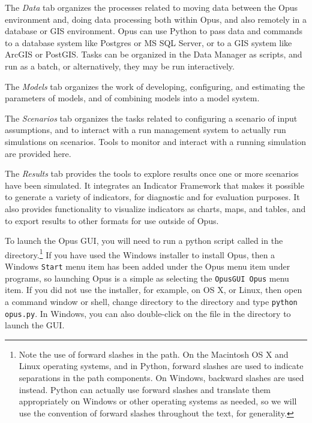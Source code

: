 \squishlist
\item The \emph{Data} tab organizes the processes related to moving data
  between the Opus environment and, doing data processing both within Opus,
  and also remotely in a database or GIS environment.  Opus can use Python
  to pass data and commands to a database system like Postgres or MS SQL
  Server, or to a GIS system like ArcGIS or PostGIS.  Tasks can be
  organized in the Data Manager as scripts, and run as a batch, or
  alternatively, they may be run interactively.
\item The \emph{Models} tab organizes the work of developing, configuring,
  and estimating the parameters of models, and of combining models into a
  model system.
\item The \emph{Scenarios} tab organizes the tasks related to configuring a
  scenario of input assumptions, and to interact with a run management
  system to actually run simulations on scenarios.  Tools to monitor and
  interact with a running simulation are provided here.
\item The \emph{Results} tab provides the tools to explore results once one
  or more scenarios have been simulated.  It integrates an Indicator
  Framework that makes it possible to generate a variety of indicators, for
  diagnostic and for evaluation purposes.  It also provides functionality
  to visualize indicators as charts, maps, and tables, and to export
  results to other formats for use outside of Opus.  \squishend

To launch the Opus GUI, you will need to run a python script called
 in the  directory.\footnote{Note
  the use of forward slashes in the path.  On the Macintosh OS X and Linux
  operating systems, and in Python, forward slashes are used to indicate
  separations in the path components.  On Windows, backward slashes are
  used instead.  Python can actually use forward slashes and translate them
  appropriately on Windows or other operating systems as needed, so we will
  use the convention of forward slashes throughout the text, for
  generality.}  If you have used the Windows installer to install Opus,
then a Windows \texttt{Start} menu item has been added under the Opus menu
item under programs, so launching Opus is a simple as selecting the
\texttt{OpusGUI Opus} menu item.  If you did not use the installer, for
example, on OS X, or Linux, then open a command window or shell, change
directory to the  directory and type \texttt{python
  opus.py}.  In Windows, you can also double-click on the 
file in the  directory to launch the GUI.

